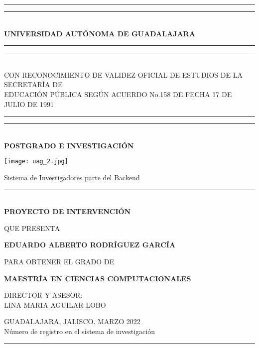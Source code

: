 
\begin{titlepage}
    \begin{center}
        \rule{\textwidth}{4pt}\vspace*{-\baselineskip}\vspace*{2pt} %
        \rule{\textwidth}{1pt}\\[\baselineskip] %
        \textbf{\normalsize UNIVERSIDAD AUTÓNOMA DE GUADALAJARA} %
        \rule{\textwidth}{0.4pt}\vspace*{-\baselineskip}\vspace{3.2pt} %
        \rule{\textwidth}{1.6pt}\\[\baselineskip] %
        
        {\tiny CON RECONOCIMIENTO DE VALIDEZ OFICIAL DE ESTUDIOS DE LA SECRETARÍA DE \\ EDUCACIÓN PÚBLICA SEGÚN ACUERDO No.158 DE FECHA 17 DE JULIO DE 1991} %
        \rule{\textwidth}{0.4pt}\vspace*{-\baselineskip}\vspace{3.2pt} %
        \rule{\textwidth}{1.6pt}\\[\baselineskip] %

        \textbf{\small POSTGRADO E INVESTIGACIÓN} %
        
        \vspace*{1.2cm}
        \texttt{[image: uag\_2.jpg]}
        \vspace*{1.2cm}
        
        {\small Sistema de Investigadores parte del Backend}
        \rule{\textwidth}{0.6pt}\\[\baselineskip] %
        
        \textbf{\small PROYECTO DE INTERVENCIÓN} %
        \vspace*{1.2cm} 
        
        {\scriptsize QUE PRESENTA}
        
        \textbf{\scriptsize EDUARDO ALBERTO RODRÍGUEZ GARCÍA }
        \vspace*{1.2cm}
        
        {\scriptsize PARA OBTENER EL GRADO DE}
        
        \textbf{\small MAESTRÍA EN CIENCIAS COMPUTACIONALES} %
        \vspace*{1.2cm}
        
        {\scriptsize DIRECTOR Y ASESOR:\\ LINA MARIA AGUILAR LOBO}
        
        \vfill
        
        {\scriptsize GUADALAJARA, JALISCO. MARZO 2022 \\ Número de registro en el sistema de investigación}
        \rule{\textwidth}{4pt}\vspace*{-\baselineskip}\vspace*{2pt} %
    \end{center}
\end{titlepage}